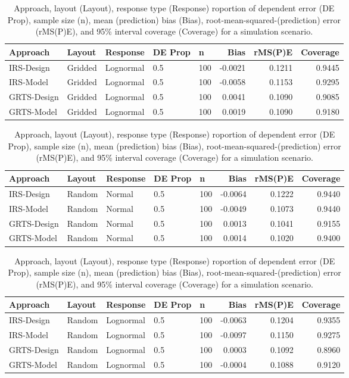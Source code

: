 \documentclass[]{elsarticle} %
\begin{document}
\begin{table}[ht]
\centering
\begin{tabular}{lllllrrr}
  \hline
Approach & Layout & Response & DE Prop & n & Bias & rMS(P)E & Coverage \\ 
  \hline
IRS-Design & Gridded & Lognormal & 0.5 & 100 & -0.0021 & 0.1211 & 0.9445 \\ 
  IRS-Model & Gridded & Lognormal & 0.5 & 100 & -0.0058 & 0.1153 & 0.9295 \\ 
  GRTS-Design & Gridded & Lognormal & 0.5 & 100 & 0.0041 & 0.1090 & 0.9085 \\ 
  GRTS-Model & Gridded & Lognormal & 0.5 & 100 & 0.0019 & 0.1090 & 0.9180 \\ 
   \hline
\end{tabular}
\caption{Approach, layout (Layout), response type (Response) roportion of dependent error (DE Prop), sample size (n), mean (prediction) bias (Bias), root-mean-squared-(prediction) error (rMS(P)E), and 95\% interval coverage (Coverage) for a simulation scenario.} 
\end{table}
\begin{table}[ht]
\centering
\begin{tabular}{lllllrrr}
  \hline
Approach & Layout & Response & DE Prop & n & Bias & rMS(P)E & Coverage \\ 
  \hline
IRS-Design & Random & Normal & 0.5 & 100 & -0.0064 & 0.1222 & 0.9440 \\ 
  IRS-Model & Random & Normal & 0.5 & 100 & -0.0049 & 0.1073 & 0.9440 \\ 
  GRTS-Design & Random & Normal & 0.5 & 100 & 0.0013 & 0.1041 & 0.9155 \\ 
  GRTS-Model & Random & Normal & 0.5 & 100 & 0.0014 & 0.1020 & 0.9400 \\ 
   \hline
\end{tabular}
\caption{Approach, layout (Layout), response type (Response) roportion of dependent error (DE Prop), sample size (n), mean (prediction) bias (Bias), root-mean-squared-(prediction) error (rMS(P)E), and 95\% interval coverage (Coverage) for a simulation scenario.} 
\end{table}
\begin{table}[ht]
\centering
\begin{tabular}{lllllrrr}
  \hline
Approach & Layout & Response & DE Prop & n & Bias & rMS(P)E & Coverage \\ 
  \hline
IRS-Design & Random & Lognormal & 0.5 & 100 & -0.0063 & 0.1204 & 0.9355 \\ 
  IRS-Model & Random & Lognormal & 0.5 & 100 & -0.0097 & 0.1150 & 0.9275 \\ 
  GRTS-Design & Random & Lognormal & 0.5 & 100 & 0.0003 & 0.1092 & 0.8960 \\ 
  GRTS-Model & Random & Lognormal & 0.5 & 100 & -0.0004 & 0.1088 & 0.9120 \\ 
   \hline
\end{tabular}
\caption{Approach, layout (Layout), response type (Response) roportion of dependent error (DE Prop), sample size (n), mean (prediction) bias (Bias), root-mean-squared-(prediction) error (rMS(P)E), and 95\% interval coverage (Coverage) for a simulation scenario.} 
\end{table}
\end{document}
